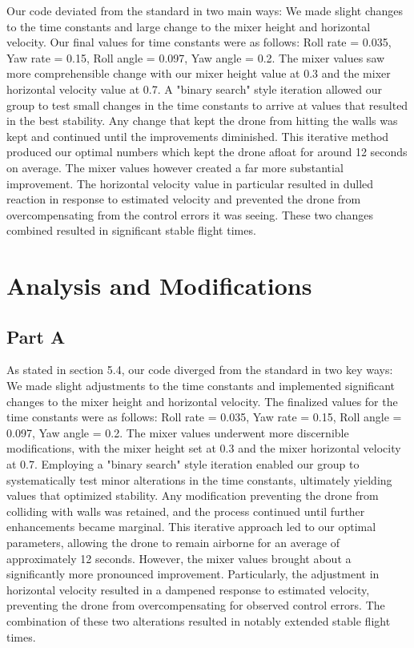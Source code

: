 \documentclass{article}
\begin{document}
Our code deviated from the standard in two main ways: We made slight changes to the time constants and large change to the mixer height and horizontal velocity. Our final values for time constants were as follows: Roll rate  = 0.035, Yaw rate = 0.15, Roll angle = 0.097, Yaw angle = 0.2. The mixer values saw more comprehensible change with our mixer height value at 0.3 and the mixer horizontal velocity value at 0.7. A "binary search" style iteration allowed our group to test small changes in the time constants to arrive at values that resulted in the best stability. Any change that kept the drone from hitting the walls was kept and continued until the improvements diminished. This iterative method produced our optimal numbers which kept the drone afloat for around 12 seconds on average. The mixer values however created a far more substantial improvement. The horizontal velocity value in particular resulted in dulled reaction in response to estimated velocity and prevented the drone from overcompensating from the control errors it was seeing. These two changes combined resulted in significant stable flight times. 

\section{Analysis and Modifications}
\subsection{Part A}
As stated in section 5.4, our code diverged from the standard in two key ways: We made slight adjustments to the time constants and implemented significant changes to the mixer height and horizontal velocity. The finalized values for the time constants were as follows: Roll rate = 0.035, Yaw rate = 0.15, Roll angle = 0.097, Yaw angle = 0.2. The mixer values underwent more discernible modifications, with the mixer height set at 0.3 and the mixer horizontal velocity at 0.7. Employing a "binary search" style iteration enabled our group to systematically test minor alterations in the time constants, ultimately yielding values that optimized stability. Any modification preventing the drone from colliding with walls was retained, and the process continued until further enhancements became marginal. This iterative approach led to our optimal parameters, allowing the drone to remain airborne for an average of approximately 12 seconds. However, the mixer values brought about a significantly more pronounced improvement. Particularly, the adjustment in horizontal velocity resulted in a dampened response to estimated velocity, preventing the drone from overcompensating for observed control errors. The combination of these two alterations resulted in notably extended stable flight times.
\end{document}
